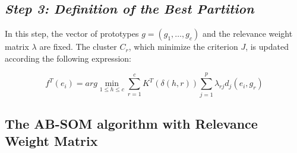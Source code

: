 \documentclass[10pt, conference, compsocconf]{IEEEtran}
\begin{document}
\subsection*{\textbf{\textit{Step 3: Definition of the Best Partition}}}

In this step, the vector of prototypes $g = (g_1, \dots, g_c)$ and the relevance weight matrix $\lambda$ are fixed. The cluster $C_r$, which minimize the criterion $J$, is updated according the following expression:


\begin{equation}
f^T(e_i) = arg \min_{1\leq h\leq c} \sum_{r=1}^c K^T (\delta(h,r)) \sum_{j=1}^p \lambda_{rj} d_j(e_i, g_r)
\label{cluster}
\end{equation}

\subsection{The AB-SOM algorithm with Relevance Weight Matrix}
\end{document}
